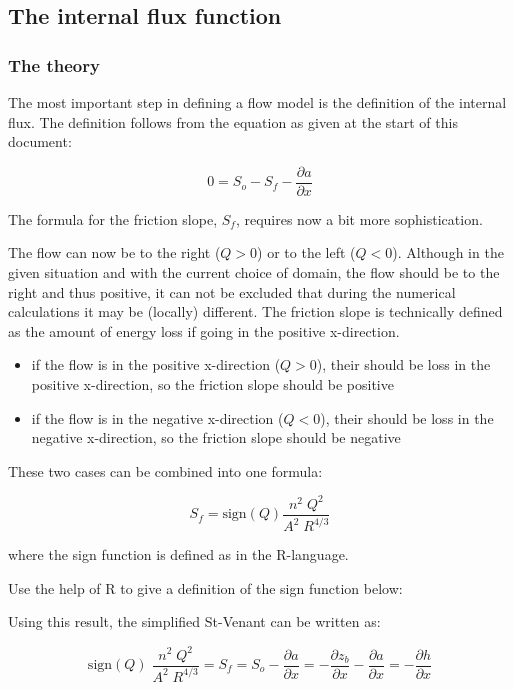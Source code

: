 \documentclass[
]{article}
\providecommand{\tightlist}{%
  \setlength{\itemsep}{0pt}\setlength{\parskip}{0pt}}
\begin{document}
\hypertarget{the-internal-flux-function}{%
\subsection{The internal flux
function}\label{the-internal-flux-function}}

\hypertarget{the-theory}{%
\subsubsection{The theory}\label{the-theory}}

The most important step in defining a flow model is the definition of
the internal flux. The definition follows from the equation as given at
the start of this document:

\[
0 =  S_o - S_f - \frac{\partial a}{\partial x} 
\]

The formula for the friction slope, \(S_f\), requires now a bit more
sophistication.

The flow can now be to the right (\(Q>0\)) or to the left (\(Q<0\)).
Although in the given situation and with the current choice of domain,
the flow should be to the right and thus positive, it can not be
excluded that during the numerical calculations it may be (locally)
different. The friction slope is technically defined as the amount of
energy loss if going in the positive x-direction.

\begin{itemize}
\tightlist
\item
  if the flow is in the positive x-direction (\(Q>0\)), their should be
  loss in the positive x-direction, so the friction slope should be
  positive
\item
  if the flow is in the negative x-direction (\(Q<0\)), their should be
  loss in the negative x-direction, so the friction slope should be
  negative
\end{itemize}

These two cases can be combined into one formula:

\[
S_f = \mathrm{sign}(Q) \frac{n^2\; Q^2}{A^2\; R^{4/3}} 
\]

where the sign function is defined as in the R-language.

Use the help of R to give a definition of the sign function below:

Using this result, the simplified St-Venant can be written as:

\[
 \mathrm{sign}(Q) \; 
 \frac{n^2\; Q^2}{A^2\; R^{4/3}} = S_f = S_o - \frac{\partial a}{\partial x}  = 
 -\frac{\partial z_b}{\partial x} - \frac{\partial a}{\partial x} = 
 -\frac{\partial h}{\partial x}
\]
\end{document}
